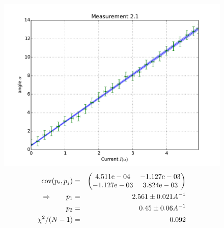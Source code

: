 \begin{figure}
    \begin{centering}
        \includegraphics[width=18cm]{figures/fig21}
\captionsetup{singlelinecheck=off} 
\caption[.]{
\begin{eqnarray}
    \mathrm{cov}(p_i, p_j) &=& 
    \begin{pmatrix}
        4.511\mathrm{e}-04 &-1.127\mathrm{e}-03 \\
        -1.127\mathrm{e}-03 &3.824\mathrm{e}-03 \\
    \end{pmatrix}
\\ \Rightarrow \qquad
    p_1 &=& 2.561 \pm 0.021 A^{-1}\\
    p_2 &=& 0.45 \pm 0.06 A^{-1} \\ 
    \chi ^2/(N-1) &=&  0.092
\end{eqnarray}
}

    \end{centering}
\end{figure}
